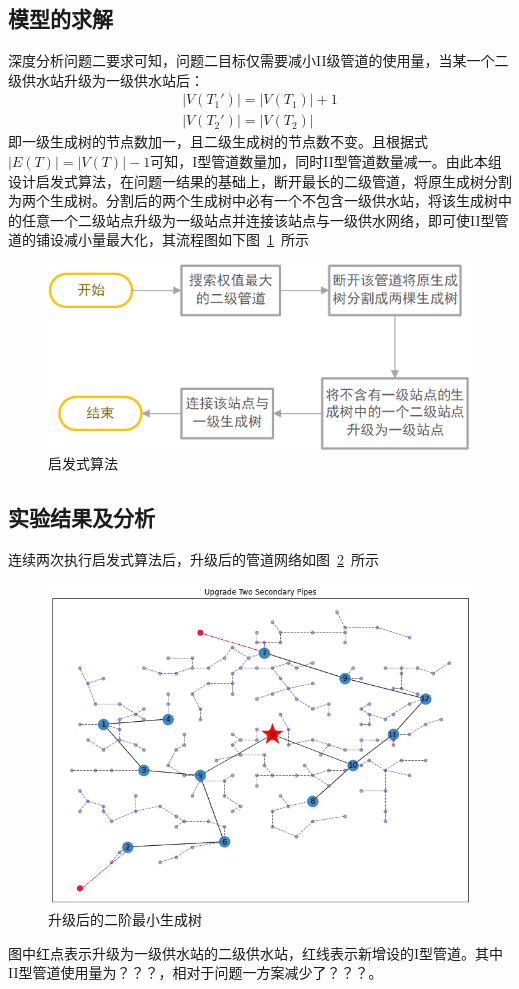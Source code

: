 \documentclass{whutmod}
\begin{document}
		\subsection{模型的求解}
		深度分析问题二要求可知，问题二目标仅需要减小II级管道的使用量，当某一个二级供水站升级为一级供水站后：
			\begin{gather*}
			|V(T_{1}')|= |V(T_{1})|+1\\
			|V(T_{2}')|=|V(T_{2})|
	        \end{gather*}
	    即一级生成树的节点数加一，且二级生成树的节点数不变。且根据式$|E(T)|=|V(T)|-1 $可知，I型管道数量加，同时II型管道数量减一。由此本组设计启发式算法，在问题一结果的基础上，断开最长的二级管道，将原生成树分割为两个生成树。分割后的两个生成树中必有一个不包含一级供水站，将该生成树中的任意一个二级站点升级为一级站点并连接该站点与一级供水网络，即可使II型管道的铺设减小量最大化，其流程图如下图~\ref{gfhssssd}~所示
	        \begin{figure}[H]
	        	\centering
	        	\includegraphics[width=\textwidth]{figures/2163.png}
	        	\caption{启发式算法}\label{gfhssssd}
	        \end{figure}
        \subsection{实验结果及分析}
        连续两次执行启发式算法后，升级后的管道网络如图~\ref{vwrhbu}~所示
		  \begin{figure}[H]
			\centering
			\includegraphics[width=\textwidth]{figures/333.png}
			\caption{升级后的二阶最小生成树}\label{vwrhbu}
		\end{figure}
        图中红点表示升级为一级供水站的二级供水站，红线表示新增设的I型管道。其中II型管道使用量为？？？，相对于问题一方案减少了？？？。
	
\end{document}

